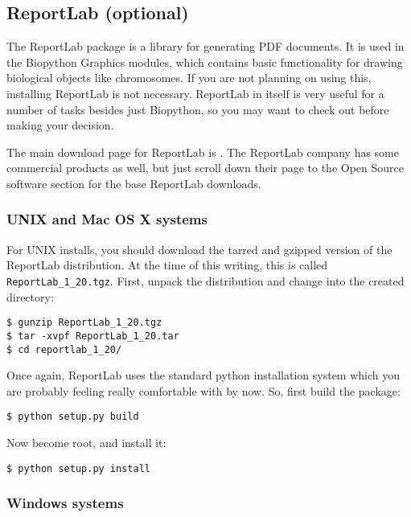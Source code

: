 \documentclass{article}
\begin{document}
\subsection{ReportLab (optional)}

The ReportLab package is a library for generating PDF documents. It is
used in the Biopython Graphics modules, which contains basic
functionality for drawing biological objects like chromosomes. If you
are not planning on using this, installing ReportLab is not necessary.
ReportLab in itself is very useful for a number of tasks besides just
Biopython, so you may want to check out
 before making your decision.


The main download page for ReportLab is
. The ReportLab
company has some commercial products as well, but just scroll down their
page to the Open Source software section for the base ReportLab
downloads.

\subsubsection{UNIX and Mac OS X systems}

For UNIX installs, you should download the tarred and gzipped version of
the ReportLab distribution. At the time of this writing, this is called
\verb|ReportLab_1_20.tgz|. First, unpack the distribution and change
into the created directory:

\begin{verbatim}
$ gunzip ReportLab_1_20.tgz 
$ tar -xvpf ReportLab_1_20.tar
$ cd reportlab_1_20/
\end{verbatim}

Once again, ReportLab uses the standard python installation system which
you are probably feeling really comfortable with by now. So, first build
the package:

\begin{verbatim}
$ python setup.py build
\end{verbatim}

Now become root, and install it:

\begin{verbatim}
$ python setup.py install
\end{verbatim}

\subsubsection{Windows systems}
\end{document}

